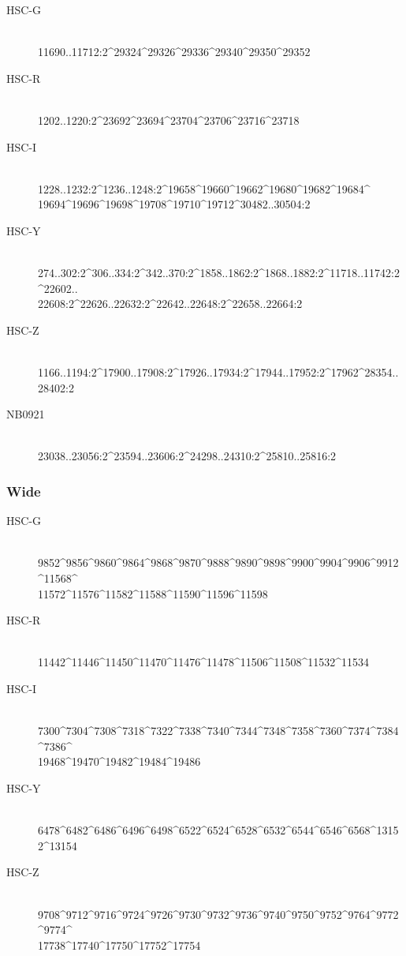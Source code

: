 \documentclass[DM,lsstdraft,STS,toc]{lsstdoc}
\begin{document}
\begin{description}

\item[HSC-G]{\hfill \\ 11690..11712:2\^{}29324\^{}29326\^{}29336\^{}29340\^{}29350\^{}29352}
\item[HSC-R]{\hfill \\ 1202..1220:2\^{}23692\^{}23694\^{}23704\^{}23706\^{}23716\^{}23718}
\item[HSC-I]{\hfill \\ 1228..1232:2\^{}1236..1248:2\^{}19658\^{}19660\^{}19662\^{}19680\^{}19682\^{}19684\^{}\\19694\^{}19696\^{}19698\^{}19708\^{}19710\^{}19712\^{}30482..30504:2}
\item[HSC-Y]{\hfill \\ 274..302:2\^{}306..334:2\^{}342..370:2\^{}1858..1862:2\^{}1868..1882:2\^{}11718..11742:2\^{}22602..\\22608:2\^{}22626..22632:2\^{}22642..22648:2\^{}22658..22664:2}
\item[HSC-Z]{\hfill \\ 1166..1194:2\^{}17900..17908:2\^{}17926..17934:2\^{}17944..17952:2\^{}17962\^{}28354..28402:2}
\item[NB0921]{\hfill \\ 23038..23056:2\^{}23594..23606:2\^{}24298..24310:2\^{}25810..25816:2}

\end{description}

\subsubsection{Wide}

\begin{description}

\item[HSC-G]{\hfill \\ 9852\^{}9856\^{}9860\^{}9864\^{}9868\^{}9870\^{}9888\^{}9890\^{}9898\^{}9900\^{}9904\^{}9906\^{}9912\^{}11568\^{}\\11572\^{}11576\^{}11582\^{}11588\^{}11590\^{}11596\^{}11598}
\item[HSC-R]{\hfill \\ 11442\^{}11446\^{}11450\^{}11470\^{}11476\^{}11478\^{}11506\^{}11508\^{}11532\^{}11534}
\item[HSC-I]{\hfill \\ 7300\^{}7304\^{}7308\^{}7318\^{}7322\^{}7338\^{}7340\^{}7344\^{}7348\^{}7358\^{}7360\^{}7374\^{}7384\^{}7386\^{}\\19468\^{}19470\^{}19482\^{}19484\^{}19486}
\item[HSC-Y]{\hfill \\ 6478\^{}6482\^{}6486\^{}6496\^{}6498\^{}6522\^{}6524\^{}6528\^{}6532\^{}6544\^{}6546\^{}6568\^{}13152\^{}13154}
\item[HSC-Z]{\hfill \\ 9708\^{}9712\^{}9716\^{}9724\^{}9726\^{}9730\^{}9732\^{}9736\^{}9740\^{}9750\^{}9752\^{}9764\^{}9772\^{}9774\^{}\\17738\^{}17740\^{}17750\^{}17752\^{}17754}

\end{description}
\end{document}
